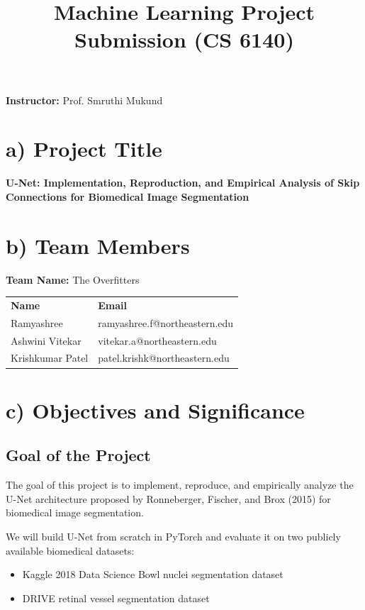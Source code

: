 \documentclass[12pt]{article}
\title{Machine Learning Project Submission (CS 6140)}
\author{}
\date{}
\begin{document}
\maketitle

\noindent
\textbf{Instructor:} Prof. Smruthi Mukund

\section*{a) Project Title}

\textbf{U-Net: Implementation, Reproduction, and Empirical Analysis of Skip Connections for Biomedical Image Segmentation}

\section*{b) Team Members}

\textbf{Team Name:} The Overfitters

\begin{center}
\begin{tabular}{ll}
\textbf{Name} & \textbf{Email} \\
Ramyashree & ramyashree.f@northeastern.edu \\
Ashwini Vitekar & vitekar.a@northeastern.edu \\
Krishkumar Patel & patel.krishk@northeastern.edu \\
\end{tabular}
\end{center}

\section*{c) Objectives and Significance}

\subsection*{Goal of the Project}

The goal of this project is to implement, reproduce, and empirically analyze the U-Net architecture proposed by Ronneberger, Fischer, and Brox (2015) for biomedical image segmentation.

We will build U-Net from scratch in PyTorch and evaluate it on two publicly available biomedical datasets:

\begin{itemize}
\item Kaggle 2018 Data Science Bowl nuclei segmentation dataset
\item DRIVE retinal vessel segmentation dataset
\end{itemize}
\end{document}
